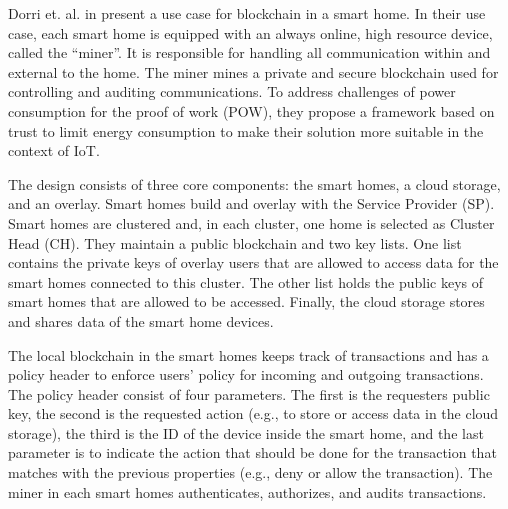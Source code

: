 Dorri et. al. in \cite{Dorri2017SmartHome} present a use case for blockchain in a smart home. In their use case, each smart home is equipped with an always online, high resource device, called the ``miner''. It is responsible for handling all communication within and external to the home.
The miner mines a private and secure blockchain used for controlling and auditing communications. To address challenges of power consumption for the proof of work (POW), they propose a framework based on trust to limit energy consumption to make their solution more suitable in the context of IoT.

The design consists of three core components: the smart homes, a cloud storage, and an overlay.
Smart homes build and overlay with the Service Provider (SP). Smart homes are clustered and, in each cluster, one home is selected as Cluster Head (CH).
They maintain a public blockchain and two key lists. One list contains the private keys of overlay users that are allowed to access data for the smart homes connected to this cluster.
The other list holds the public keys of smart homes that are allowed to be accessed.
Finally, the cloud storage stores and shares data of the smart home devices.

The local blockchain in the smart homes keeps track of transactions and has a policy header to enforce users' policy for incoming and outgoing transactions.
The policy header consist of four parameters. The first is the requesters public key, the second is the requested action (e.g., to store or access data in the cloud storage), the third is the ID of the device inside the smart home,
and the last parameter is to indicate the action that should be done for the transaction that matches with the previous properties (e.g., deny or allow the transaction).
The miner in each smart homes authenticates, authorizes, and audits transactions.
